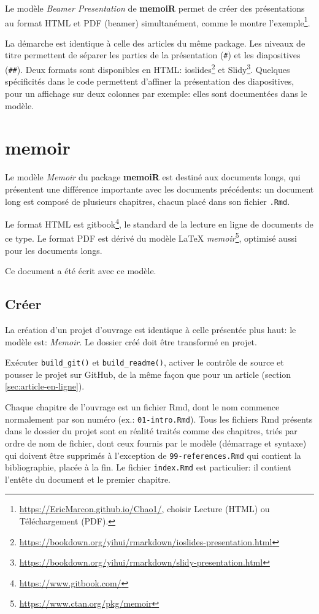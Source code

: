 \documentclass[
  12pt,
  french,
  a4paper,
  extrafontsizes,onecolumn,openright
  ]{memoir}
\begin{document}
Le modèle \emph{Beamer Presentation} de \textbf{memoiR} permet de créer des présentations au format HTML et PDF (beamer) simultanément, comme le montre l'exemple\footnote{\url{https://EricMarcon.github.io/Chao1/}, choisir Lecture (HTML) ou Téléchargement (PDF).}.

La démarche est identique à celle des articles du même package.
Les niveaux de titre permettent de séparer les parties de la présentation (\texttt{\#}) et les diapositives (\texttt{\#\#}).
Deux formats sont disponibles en HTML: ioslides\footnote{\url{https://bookdown.org/yihui/rmarkdown/ioslides-presentation.html}} et Slidy\footnote{\url{https://bookdown.org/yihui/rmarkdown/slidy-presentation.html}}.
Quelques spécificités dans le code permettent d'affiner la présentation des diapositives, pour un affichage sur deux colonnes par exemple: elles sont documentées dans le modèle.

\hypertarget{memoir}{%
\section{memoir}\label{memoir}}

Le modèle \emph{Memoir} du package \textbf{memoiR} est destiné aux documents longs, qui présentent une différence importante avec les documents précédents: un document long est composé de plusieurs chapitres, chacun placé dans son fichier \texttt{.Rmd}.

Le format HTML est gitbook\footnote{\url{https://www.gitbook.com/}}, le standard de la lecture en ligne de documents de ce type.
Le format PDF est dérivé du modèle LaTeX \emph{memoir}\footnote{\url{https://www.ctan.org/pkg/memoir}}, optimisé aussi pour les documents longs.

Ce document a été écrit avec ce modèle.

\hypertarget{cruxe9er-1}{%
\subsection{Créer}\label{cruxe9er-1}}

La création d'un projet d'ouvrage est identique à celle présentée plus haut: le modèle est: \emph{Memoir}.
Le dossier créé doit être transformé en projet.

Exécuter \texttt{build\_git()} et \texttt{build\_readme()}, activer le contrôle de source et pousser le projet sur GitHub, de la même façon que pour un article (section \ref{sec:article-en-ligne}).

Chaque chapitre de l'ouvrage est un fichier Rmd, dont le nom commence normalement par son numéro (ex.: \texttt{01-intro.Rmd}).
Tous les fichiers Rmd présents dans le dossier du projet sont en réalité traités comme des chapitres, triés par ordre de nom de fichier, dont ceux fournis par le modèle (démarrage et syntaxe) qui doivent être supprimés à l'exception de \texttt{99-references.Rmd} qui contient la bibliographie, placée à la fin.
Le fichier \texttt{index.Rmd} est particulier: il contient l'entête du document et le premier chapitre.
\end{document}
